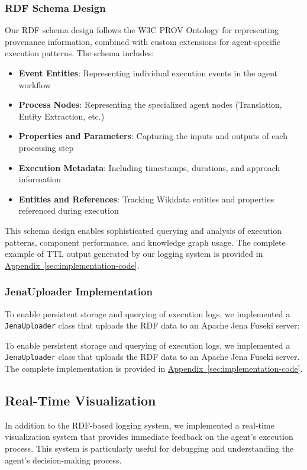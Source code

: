 \subsubsection{RDF Schema Design}
Our RDF schema design follows the W3C PROV Ontology for representing provenance information, combined with custom extensions for agent-specific execution patterns. The schema includes:

\begin{itemize}
    \item \textbf{Event Entities}: Representing individual execution events in the agent workflow
    \item \textbf{Process Nodes}: Representing the specialized agent nodes (Translation, Entity Extraction, etc.)
    \item \textbf{Properties and Parameters}: Capturing the inputs and outputs of each processing step
    \item \textbf{Execution Metadata}: Including timestamps, durations, and approach information
    \item \textbf{Entities and References}: Tracking Wikidata entities and properties referenced during execution
\end{itemize}

This schema design enables sophisticated querying and analysis of execution patterns, component performance, and knowledge graph usage. The complete example of TTL output generated by our logging system is provided in \hyperref[code:ttl-example]{Appendix~\ref{sec:implementation-code}}.

\subsubsection{JenaUploader Implementation}
To enable persistent storage and querying of execution logs, we implemented a \texttt{JenaUploader} class that uploads the RDF data to an Apache Jena Fuseki server:

To enable persistent storage and querying of execution logs, we implemented a \texttt{JenaUploader} class that uploads the RDF data to an Apache Jena Fuseki server. The complete implementation is provided in \hyperref[code:jena-uploader]{Appendix~\ref{sec:implementation-code}}.

\subsection{Real-Time Visualization}
In addition to the RDF-based logging system, we implemented a real-time visualization system that provides immediate feedback on the agent's execution process. This system is particularly useful for debugging and understanding the agent's decision-making process.

